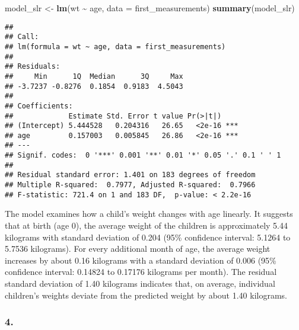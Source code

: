 \documentclass[
]{article}
\newenvironment{Shaded}{\begin{snugshade}}{\end{snugshade}}
\newcommand{\AttributeTok}[1]{\textcolor[rgb]{0.13,0.29,0.53}{#1}}
\newcommand{\FunctionTok}[1]{\textcolor[rgb]{0.13,0.29,0.53}{\textbf{#1}}}
\newcommand{\NormalTok}[1]{#1}
\newcommand{\OtherTok}[1]{\textcolor[rgb]{0.56,0.35,0.01}{#1}}
\newcommand{\SpecialCharTok}[1]{\textcolor[rgb]{0.81,0.36,0.00}{\textbf{#1}}}
\begin{document}
\begin{Shaded}
\begin{Highlighting}[]
\NormalTok{model\_slr }\OtherTok{\textless{}{-}} \FunctionTok{lm}\NormalTok{(wt }\SpecialCharTok{\textasciitilde{}}\NormalTok{ age, }\AttributeTok{data =}\NormalTok{ first\_measurements)}
\FunctionTok{summary}\NormalTok{(model\_slr)}
\end{Highlighting}
\end{Shaded}

\begin{verbatim}
## 
## Call:
## lm(formula = wt ~ age, data = first_measurements)
## 
## Residuals:
##     Min      1Q  Median      3Q     Max 
## -3.7237 -0.8276  0.1854  0.9183  4.5043 
## 
## Coefficients:
##             Estimate Std. Error t value Pr(>|t|)    
## (Intercept) 5.444528   0.204316   26.65   <2e-16 ***
## age         0.157003   0.005845   26.86   <2e-16 ***
## ---
## Signif. codes:  0 '***' 0.001 '**' 0.01 '*' 0.05 '.' 0.1 ' ' 1
## 
## Residual standard error: 1.401 on 183 degrees of freedom
## Multiple R-squared:  0.7977, Adjusted R-squared:  0.7966 
## F-statistic: 721.4 on 1 and 183 DF,  p-value: < 2.2e-16
\end{verbatim}

The model examines how a child's weight changes with age linearly. It
suggests that at birth (age 0), the average weight of the children is
approximately 5.44 kilograms with standard deviation of 0.204 (95\%
confidence interval: 5.1264 to 5.7536 kilograms). For every additional
month of age, the average weight increases by about 0.16 kilograms with
a standard deviation of 0.006 (95\% confidence interval: 0.14824 to
0.17176 kilograms per month). The residual standard deviation of 1.40
kilograms indicates that, on average, individual children's weights
deviate from the predicted weight by about 1.40 kilograms.

\subsubsection{4.}\label{section-2}
\end{document}
